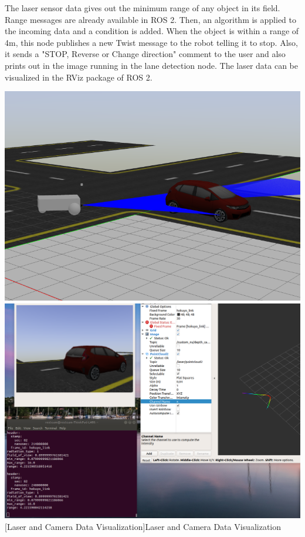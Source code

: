 \documentclass[%
xelatex,
	oneside,		%
	12pt,			%
	parskip=half,	%
	abstracton,
	chapterprefix=true%
    appendixprefix=true]
{scrbook}
\begin{document}
The laser sensor data gives out the minimum range of any object in its field. Range messages are already available in ROS 2. Then, an algorithm is applied to the incoming data and a condition is added. When the object is within a range of 4m, this node publishes a new Twist message to the robot telling it to stop. Also, it sends a "STOP, Reverse or Change direction" comment to the user and also prints out in the image running in the lane detection node. The laser data can be visualized in the RViz package of ROS 2.
			\begin{center}
\includegraphics[scale=0.3]{fig/laser.png}
\includegraphics[scale=0.17]{fig/laser2.png}
[Laser and Camera Data Visualization]{Laser and Camera Data Visualization}
\label{fig:laser}
\end{center}
\end{document}
